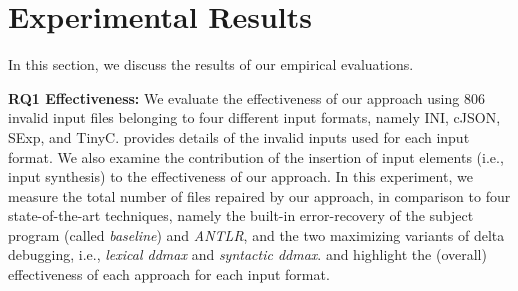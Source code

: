 \documentclass[sigconf,review,anonymous]{acmart}
\newcounter{todocounter}
\newcommand{\todo}[1]{\marginpar{$|$}\textcolor{red}{\stepcounter{todocounter}\footnote[\thetodocounter]{\textcolor{red}{\textbf{TODO }}\textit{#1}}}}
\newcommand{\recheck}[1]{\textcolor{red}{#1}}
\renewcommand{\todo}[1]{}
\newcommand{\approach}{\textsc{BRepair}\xspace}
\begin{document}
\section{Experimental Results}
\label{sec:results}

In this section, we
discuss the %
results
of our empirical evaluations.


\noindent
\textbf{RQ1 Effectiveness:}
We evaluate the effectiveness of our approach using 806 invalid input files belonging to four different input formats, namely INI, cJSON, SExp, and TinyC.   provides details of the %
invalid inputs used for each input format.
We also examine the contribution of the insertion  of input elements (i.e., input synthesis) to the effectiveness of our approach.
In this experiment,
we measure the total number of files repaired by our approach, in comparison to
four state-of-the-art techniques,
namely the built-in error-recovery of the subject program (called \textit{baseline}) and \textit{ANTLR}, and %
the two maximizing variants of delta debugging, i.e., \textit{lexical ddmax} and \textit{syntactic ddmax}.    and  highlight the (overall) effectiveness of each approach %
for each input format.


\end{document}
